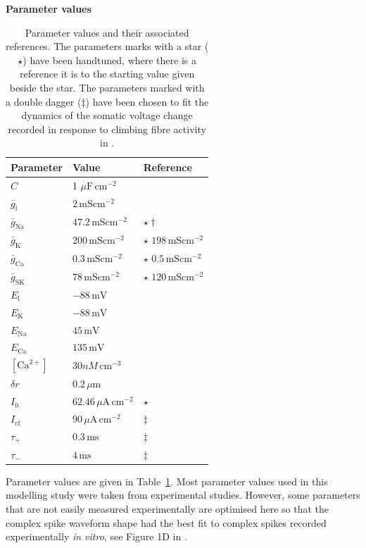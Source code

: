 \documentclass[twocolumn]{svjour3}          %
\newcommand{\mv}{\,\mathrm{mV}}
\newcommand{\msi}{\,\mathrm{mS cm^{-2}}}
\newcommand{\mse}{\,\mathrm{ms}}
\newcommand{\cm}{\,\mathrm{cm}}
\renewcommand{\k}{\mathrm{K}}
\newcommand{\ca}{\mathrm{Ca}}
\newcommand{\na}{\mathrm{Na}}
\newcommand{\sk}{\mathrm{SK}}
\newcommand{\leak}{\mathrm{l}}
\begin{document}
\begin{table}[!t]
\centering
\textbf{Parameter values}
\begin{center}
\begin{tabular}{|l l l|}
\hline
Parameter & Value & Reference \\ \hline
$C$&1 $\mu\mathrm{F}\,\mathrm{cm}^{-2}$& \citep{RothHausser2001}\\ \hline
$\bar{g}_\leak$&$2\msi$& \citep{RappEtAl1994}\\ \hline
$\bar{g}_\na$&$47.2\msi$&  $\star\dagger$\\ \hline
$\bar{g}_\k$ &$200\msi$& $\star$ $198\msi$ \citep{AkemannKnopfel2006}\\ \hline
$\bar{g}_\ca$&$0.3\msi$& $\star$ $0.5\msi$ \citep{MiyashoEtAl2001} \\ \hline
$\bar{g}_\sk$&$78\msi$& $\star$ $120\msi$ \citep{RubinCleland2006}\\ \hline
$E_\leak$&$-88\mv$& \citep{MasoliEtAl2015}\\ \hline
$E_\k$&$-88\mv$& \citep{MasoliEtAl2015}\\ \hline
$E_\na$&$45\mv$& \citep{DeSchutterBower1994a}\\ \hline
$E_\ca$&$135\mv$& \citep{DeSchutterBower1994a}\\ \hline
$[\ca^{2+}]$&$30 nM\cm^{-3}$& \citep{KanoEtAl1995}\\ \hline
$\delta r$&$0.2\,\mu\mathrm{m}$& \\ \hline
$I_0$&$62.46\,\mu\mathrm{A}\cm^{-2}$& $\star$\\ \hline
$I_{\mathrm{cf}}$&$90\,\mu\mathrm{A}\cm^{-2}$& $\ddagger$\citep{StuartHausser1994}\\ \hline
$\tau_+$&$0.3\mse$&  $\ddagger$\citep{StuartHausser1994}\\ \hline
$\tau_-$&$4\mse$& $\ddagger$\citep{StuartHausser1994}\\ \hline
\end{tabular}
\end{center}
\caption{Parameter values and their associated references. The
  parameters marks with a star ($\star$) have been handtuned, where
  there is a reference it is to the starting value given beside the
  star. The parameters marked with a double dagger ($\ddagger$) have
  been chosen to fit the dynamics of the somatic voltage change
  recorded in response to climbing fibre activity in
  \protect\citet{DavieEtAl2008}.}
\label{table1}
\end{table}

Parameter values are given in Table~\ref{table1}. Most parameter
values used in this modelling study were taken from experimental
studies. However, some parameters that are not easily measured
experimentally are optimised here so that the complex spike waveform
shape had the best fit to complex spikes recorded experimentally
\textit{in vitro}, see Figure 1D in \citet{DavieEtAl2008}.
\end{document}
